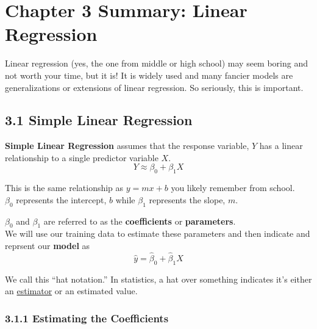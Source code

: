 

    \section*{Chapter 3 Summary: Linear Regression}\label{chapter-3-summary-linear-regression}
        Linear regression (yes, the one from middle or high school) may seem boring and not worth your time, but it is! 
        It is widely used and many    fancier models are generalizations or extensions of linear regression.    So seriously, this is important.
        \subsection*{3.1 Simple Linear Regression}
        \textbf{Simple Linear Regression} assumes that the response variable, \(Y\) has a linear relationship to a single predictor variable \(X\).
        \begin{equation*}\tag{3.1}
            Y \approx \beta_0 + \beta_1 X
        \end{equation*}
        
        
        \begin{note}
            This is the same relationship as \(y=mx+b\) you likely remember from school.\\
            \(\beta_0\) represents the intercept, \(b\) while \(\beta_1\) represents the slope, \(m\).
        \end{note}
        
        \(\beta_0\) and \(\beta_1\) are referred to as the \textbf{coefficients} or \textbf{parameters}.\\
        We will use our training data to estimate these parameters and then indicate and reprsent our \textbf{model} as
        \begin{equation*}\tag{3.2}
            \hat y = \hat \beta_0 + \hat \beta_1 X
        \end{equation*}

        \begin{note}
            We call this ``hat notation.'' In statistics, a hat over something indicates it's either an
            \href{https://en.wikipedia.org/wiki/Estimator}{estimator} or an estimated value.
        \end{note}
        
        \subsubsection*{3.1.1  Estimating the Coefficients}\label{estimating-the-coefficients}
        
